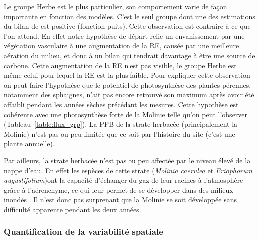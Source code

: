 Le groupe Herbe est le plus particulier, son comportement varie de façon importante en fonction des modèles.
C'est le seul groupe dont une des estimations du bilan de \coo est positive (fonction puits).
Cette observation est contraire à ce que l'on attend.
En effet notre hypothèse de départ relie un envahissement par une végétation vasculaire à une augmentation de la RE, causée par une meilleure aération du milieu, et donc à un bilan qui tendrait davantage à être une source de carbone.
Cette augmentation de la RE n'est pas visible, le groupe Herbe est même celui pour lequel la RE est la plus faible.
Pour expliquer cette observation on peut faire l'hypothèse que le potentiel de photosynthèse des plantes pérennes, notamment des sphaignes, n'ait pas encore retrouvé son maximum après avoir été affaibli pendant les années sèches précédant les mesures.
Cette hypothèse est cohérente avec une photosynthèse forte de la Molinie telle qu'on peut l'observer (Tableau~\ref{table:flux_grp}).
La PPB de la strate herbacée (principalement la Molinie) n'est pas ou peu limitée que ce soit par l'histoire du site (c'est une plante annuelle).

Par ailleurs, la strate herbacée n'est pas ou peu affectée par le niveau élevé de la nappe d'eau.
En effet les espèces de cette strate (\textit{Molinia caerulea} et \textit{Eriophorum augustifolium})ont la capacité d'échanger du gaz de leur racines à l'atmosphère grâce à l'aérenchyme, ce qui leur permet de se développer dans des milieux inondés \citep{taylor2001,rydin2013c}.
Il n'est donc pas surprenant que la Molinie se soit développée sans difficulté apparente pendant les deux années.

\subsubsection{Quantification de la variabilité spatiale}

